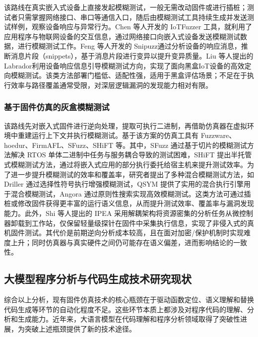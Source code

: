 该路线在真实嵌入式设备上直接发起模糊测试，一般无需改动固件或进行插桩；测试者只需掌握网络接口、串口等通信入口，随后由模糊测试工具持续生成并发送测试样例，观察设备响应与异常行为。Chen 等人开发的 IoTFuzzer\cite{iotfuzzer} 工具，就利用了应用程序与物联网设备的交互信息，通过网络接口向嵌入式设备发送模糊测试数据，进行模糊测试工作。Feng 等人开发的 Snipuzz\cite{feng2021snipuzz}通过分析设备的响应消息，推断消息片段（snippets），基于消息片段进行变异以提升变异质量。Liu 等人提出的 Labrador\cite{liu_labrador_2024}利用设备响应信息引导模糊测试方向，实现了面向黑盒IoT设备的高效定向模糊测试。该类方法部署门槛低、适配性强，适用于黑盒评估场景；不足在于执行效率与路径覆盖通常受限，对深层逻辑漏洞的发现能力相对有限。

\subsubsection{基于固件仿真的灰盒模糊测试}

该路线先对嵌入式固件进行逆向处理，提取可执行二进制，再借助仿真器在虚拟环境中重建运行上下文并执行模糊测试。基于该方案的仿真工具有 Fuzzware\cite{fuzzware}、hoedur\cite{scharnowski2023hoedur}、FirmAFL\cite{firmafl}、SFuzz\cite{chen_sfuzz_2022}、SHiFT\cite{mera_shift_2024} 等。其中，SFuzz 通过基于切片的模糊测试方法解决 RTOS 单体二进制中任务与服务耦合导致的测试困难，SHiFT 提出半托管式模糊测试方法，通过将嵌入式应用的部分执行委托给宿主机来提升测试效率。为了进一步提升模糊测试的效率和覆盖率，研究者提出了多种混合模糊测试方法，如 Driller\cite{driller} 通过选择性符号执行增强模糊测试，QSYM\cite{qsym} 提供了实用的混合执行引擎用于混合模糊测试，Angora\cite{angora} 通过原则性搜索实现高效模糊测试。这类方法可通过插桩或修改固件获得更丰富的运行语义信息，从而提升测试效率、覆盖率与漏洞发现能力。此外，Shi 等人提出的 IPEA\cite{shi_facilitating_2024} 采用解耦架构将资源密集的分析任务从微控制器卸载到工作站，仅保留轻量级探针在固件中采集执行信息，实现了非侵入式的真机固件测试。其代价是前期逆向分析成本较高，且在面对加密/保护机制时实现难度上升；同时仿真器与真实硬件之间仍可能存在语义偏差，进而影响结论的一致性。

\subsection{大模型程序分析与代码生成技术研究现状}
\label{sec:llm_related}

综合以上分析，现有固件仿真技术的核心瓶颈在于驱动函数定位、语义理解和替换代码生成等环节的自动化程度不足。这些环节本质上都涉及对程序代码的理解、分析和生成能力。近年来，大语言模型在代码理解和程序分析领域取得了突破性进展，为突破上述瓶颈提供了新的技术途径。


